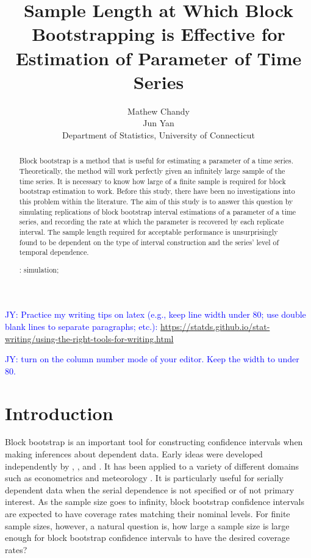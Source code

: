 \documentclass[12pt, letterpaper, titlepage]{article}
\title{Sample Length at Which Block Bootstrapping is Effective for Estimation
  of Parameter of Time Series}
\author{Mathew Chandy\\
  Jun Yan\\[1ex]
  Department of Statistics, University of Connecticut\\
}
\date{}
\newcommand{\jy}[1]{\textcolor{blue}{JY: #1}}
\begin{document}
 
\maketitle

\doublespace

\begin{abstract}
Block bootstrap is a method that is useful for estimating a parameter of a time
series. Theoretically, the method will work perfectly given an infinitely
large sample of the time series. It is necessary to know how large of a finite
sample is required for block bootstrap estimation to work. Before this study,
there have been no investigations into this problem within the literature. The
aim of this study is to answer this question by simulating replications of
block bootstrap interval estimations of a parameter of a time series, and
recording the rate at which the parameter is recovered by each replicate
interval. The sample length required for acceptable performance is
unsurprisingly found to be dependent on the type of interval construction and
the series' level of temporal dependence.


\bigskip
\noindent{}:
simulation;
\end{abstract}


\jy{Practice my writing tips on latex (e.g., keep line width under 80; use
  double blank lines to separate paragraphs; etc.):
  \url{
https://statds.github.io/stat-writing/using-the-right-tools-for-writing.html}}

\jy{turn on the column number mode of your editor. Keep the width to under 80.}


\section{Introduction}
\label{sec:intro}

Block bootstrap is an important tool for constructing confidence intervals when
making inferences about dependent data. Early ideas were developed
independently by \citet{hall1985resampling}, \citet{carlstein1986use}, and 
\citet{kunsch1989jackknife}. %
It has been applied to a variety of different domains such 
as econometrics \citep{mackinnon2006bootstrap} and meteorology
\citep{varga2017generalised}. It is particularly useful for serially dependent
data when the serial dependence is not specified or of not primary interest.
As the sample size goes to infinity, block bootstrap confidence intervals are
expected to have coverage rates matching their nominal levels. For finite
sample sizes, however, a natural question is, how large a sample size is large
enough for block bootstrap confidence intervals to have the desired coverage
rates?
\end{document}
